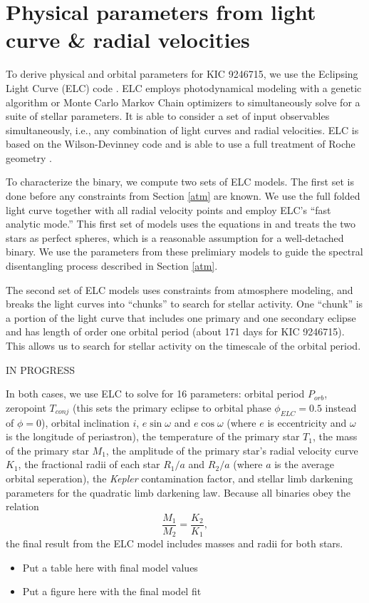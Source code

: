 \section{Physical parameters from light curve \& radial velocities}\label{model}
To derive physical and orbital parameters for KIC 9246715, we use the Eclipsing Light Curve (ELC) code \citep{oro00}. ELC employs photodynamical modeling with a genetic algorithm or Monte Carlo Markov Chain optimizers to simultaneously solve for a suite of stellar parameters. It is able to consider a set of input observables simultaneously, i.e., any combination of light curves and radial velocities. ELC is based on the Wilson-Devinney code \citep{wil71} and is able to use a full treatment of Roche geometry \citep{avn75}.

To characterize the binary, we compute two sets of ELC models. The first set is done before any constraints from Section \ref{atm} are known. We use the full folded light curve together with all radial velocity points and employ ELC's ``fast analytic mode.'' This first set of models uses the equations in \citet{gim06} and treats the two stars as perfect spheres, which is a reasonable assumption for a well-detached binary. We use the parameters from these prelimiary models to guide the spectral disentangling process described in Section \ref{atm}.

The second set of ELC models uses constraints from atmosphere modeling, and breaks the light curves into ``chunks'' to search for stellar activity. One ``chunk'' is a portion of the light curve that includes one primary and one secondary eclipse and has length of order one orbital period (about 171 days for KIC 9246715). This allows us to search for stellar activity on the timescale of the orbital period.

IN PROGRESS

In both cases, we use ELC to solve for 16 parameters: orbital period $P_{orb}$, zeropoint $T_{conj}$ (this sets the primary eclipse to orbital phase $\phi_{ELC} = 0.5$ instead of $\phi = 0$), orbital inclination $i$, $e \sin \omega$ and $e \cos \omega$ (where $e$ is eccentricity and $\omega$ is the longitude of periastron), the temperature of the primary star $T_1$, the mass of the primary star $M_1$, the amplitude of the primary star's radial velocity curve $K_1$, the fractional radii of each star $R_1/a$ and $R_2/a$ (where $a$ is the average orbital seperation), the \emph{Kepler} contamination factor, and stellar limb darkening parameters for the quadratic limb darkening law. Because all binaries obey the relation
\begin{equation}
\frac{M_1}{M_2} = \frac{K_2}{K_1},
\end{equation}
the final result from the ELC model includes masses and radii for both stars.

\begin{itemize}
\item Put a table here with final model values
\item Put a figure here with the final model fit
\end{itemize}
